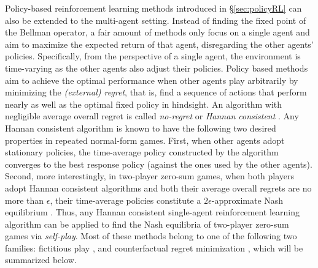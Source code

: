  Policy-based reinforcement learning methods introduced in \S\ref{sec:policyRL}
 can  also be extended to the multi-agent setting. Instead of finding the fixed point of the Bellman operator, a fair amount of methods only focus on a single agent and aim to  maximize the expected return  of that agent, disregarding  the other agents' policies.
 Specifically, 
 from the perspective of a single agent, the environment is time-varying as the other agents also  adjust their policies. Policy based methods aim to achieve the  optimal performance when other agents play arbitrarily by minimizing the 
   \textit{(external) regret}, that is, find a sequence of actions that perform nearly as well as  the  optimal fixed policy   in hindsight.
 An algorithm with negligible average overall    regret is  called \textit{no-regret} or \textit{Hannan consistent}  \cite{hannan1957approximation}.
 Any Hannan consistent algorithm is  known to have the following two desired properties in repeated normal-form games. First, when other agents adopt stationary policies, the  time-average policy constructed by the  algorithm converges to the best response policy (against the ones used by the other agents). Second, more interestingly, in two-player zero-sum games, when both players adopt Hannan consistent algorithms and both their  average overall regrets are no more than $\epsilon$,    their time-average policies constitute a $2\epsilon$-approximate Nash equilibrium \cite{blum2007learning}. 
  Thus, 
  any Hannan consistent single-agent reinforcement learning algorithm can be applied to find the Nash equilibria of  
   two-player zero-sum games via \emph{self-play}. Most of    these methods belong to one of  the following two families: 
  fictitious play \cite{brown1951iterative, robinson1951iterative}, and counterfactual regret minimization \cite{zinkevich2008regret}, which will be summarized below. 
 
 
  
